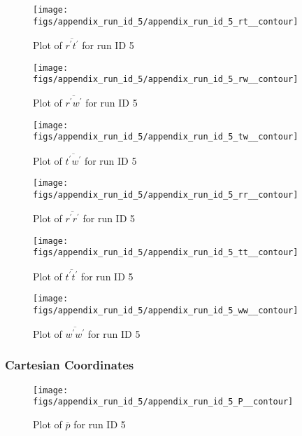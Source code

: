 \begin{figure}[H]
\centering
\texttt{[image: figs/appendix\_run\_id\_5/appendix\_run\_id\_5\_rt\_\_contour]}
\caption{Plot of $\overline{r^\prime t^\prime}$ for run ID 5}
\label{fig:appendix_run_id_5_rt__contour}
\end{figure}


\begin{figure}[H]
\centering
\texttt{[image: figs/appendix\_run\_id\_5/appendix\_run\_id\_5\_rw\_\_contour]}
\caption{Plot of $\overline{r^\prime w^\prime}$ for run ID 5}
\label{fig:appendix_run_id_5_rw__contour}
\end{figure}


\begin{figure}[H]
\centering
\texttt{[image: figs/appendix\_run\_id\_5/appendix\_run\_id\_5\_tw\_\_contour]}
\caption{Plot of $\overline{t^\prime w^\prime}$ for run ID 5}
\label{fig:appendix_run_id_5_tw__contour}
\end{figure}


\begin{figure}[H]
\centering
\texttt{[image: figs/appendix\_run\_id\_5/appendix\_run\_id\_5\_rr\_\_contour]}
\caption{Plot of $\overline{r^\prime r^\prime}$ for run ID 5}
\label{fig:appendix_run_id_5_rr__contour}
\end{figure}


\begin{figure}[H]
\centering
\texttt{[image: figs/appendix\_run\_id\_5/appendix\_run\_id\_5\_tt\_\_contour]}
\caption{Plot of $\overline{t^\prime t^\prime}$ for run ID 5}
\label{fig:appendix_run_id_5_tt__contour}
\end{figure}


\begin{figure}[H]
\centering
\texttt{[image: figs/appendix\_run\_id\_5/appendix\_run\_id\_5\_ww\_\_contour]}
\caption{Plot of $\overline{w^\prime w^\prime}$ for run ID 5}
\label{fig:appendix_run_id_5_ww__contour}
\end{figure}


\subsubsection{Cartesian Coordinates}
\begin{figure}[H]
\centering
\texttt{[image: figs/appendix\_run\_id\_5/appendix\_run\_id\_5\_P\_\_contour]}
\caption{Plot of $\overline{p}$ for run ID 5}
\label{fig:appendix_run_id_5_P__contour}
\end{figure}


